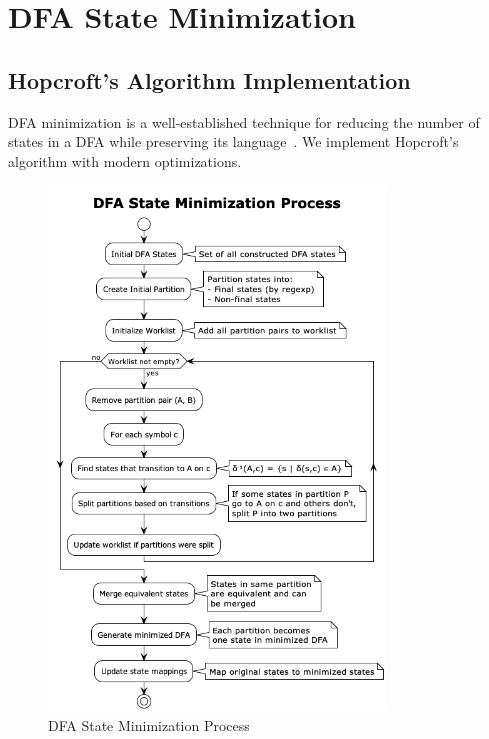 \documentclass[11pt,a4paper]{article}
\begin{document}
\section{DFA State Minimization}

\subsection{Hopcroft's Algorithm Implementation}

DFA minimization is a well-established technique for reducing the number of states in a DFA while preserving its language~\cite{hopcroft2001introduction,paige1987three}. We implement Hopcroft's algorithm with modern optimizations.

\begin{figure}[H]
\centering
\includegraphics[width=0.8\textwidth]{illustrations/state_minimization_algorithm.png}
\caption{DFA State Minimization Process}
\label{fig:minimization}
\end{figure}
\end{document}
